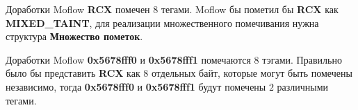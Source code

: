 \documentclass[10pt]{beamer}
\begin{document}
\begin{frame}[fragile]{Доработки Moflow}
    \textbf{RCX} помечен $8$ тегами. Moflow бы пометил бы
    \textbf{RCX} как \textbf{MIXED\_TAINT}, для реализации множественного помечивания нужна структура \textbf{Множество пометок}.


\end{frame}

\begin{frame}[fragile]{Доработки Moflow}
    \textbf{0x5678fff0} и \textbf{0x5678fff1} помечаются $8$ тэгами. Правильно было бы представить \textbf{RCX} как 8 отдельных байт, которые могут быть помечены независимо, тогда \textbf{0x5678fff0} и \textbf{0x5678fff1} будут помечены $2$ различными тегами.

\end{frame}
\end{document}

